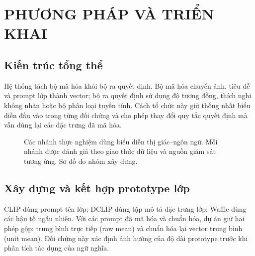 \documentclass[12pt,a4paper]{article}
\newcommand{\BodySize}{13}
\newcommand{\BodyLeading}{15.6}
\newcommand{\BodyFont}{\fontsize{\BodySize}{\BodyLeading}\selectfont}
\newcommand{\Chapter}[1]{\clearpage\section{#1}}
\numberwithin{figure}{section}
\numberwithin{table}{section}
\numberwithin{equation}{section}
\begin{document}


\Chapter{PHƯƠNG PHÁP VÀ TRIỂN KHAI}
\subsection{Kiến trúc tổng thể}
Hệ thống tách bộ mã hóa khỏi bộ ra quyết định. Bộ mã hóa chuyển ảnh, tiêu đề và prompt lớp thành vector; bộ ra quyết định sử dụng độ tương đồng, thích nghi không nhãn hoặc bộ phân loại tuyến tính. Cách tổ chức này giữ thống nhất biểu diễn đầu vào trong từng đối chứng và cho phép thay đổi quy tắc quyết định mà vẫn dùng lại các đặc trưng đã mã hóa.

\begin{figure}[H]\centering
{}
\caption{Các nhánh thực nghiệm dùng biểu diễn thị giác--ngôn ngữ. Mỗi nhánh được đánh giá theo giao thức dữ liệu và nguồn giám sát tương ứng. Sơ đồ do nhóm xây dựng.}
\label{fig:architecture}
\end{figure}

\subsection{Xây dựng và kết hợp prototype lớp}
CLIP dùng prompt tên lớp; DCLIP dùng tập mô tả đặc trưng lớp; Waffle dùng các hậu tố ngẫu nhiên. Với các prompt đã mã hóa và chuẩn hóa, dự án giữ hai phép gộp: trung bình trực tiếp (raw mean) và chuẩn hóa lại vector trung bình (unit mean). Đối chứng này xác định ảnh hưởng của độ dài prototype trước khi phân tích tác dụng của ngữ nghĩa.
\end{document}
